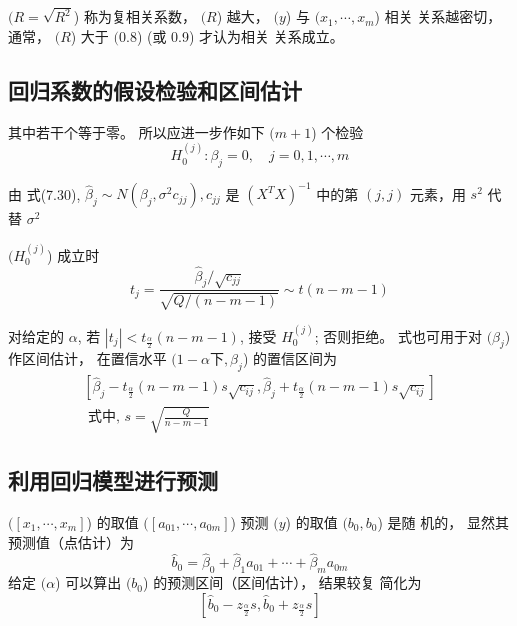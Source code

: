 $( {R}=\sqrt{{R}^{2}} $) 称为复相关系数， $( {R} $) 越大， $( {y} $) 与 $( {x}_{1}, \cdots, {x}_{m} $) 相关
关系越密切， 通常，  $( {R} $) 大于 $( 0.8 $) (或 0.9) 才认为相关
关系成立。 

\subsection{回归系数的假设检验和区间估计}

其中若干个等于零。 所以应进一步作如下 $( {m}+{1} $) 个检验
\begin{equation}H_{0}^{(j)}: \beta_{j}=0, \quad j=0,1, \cdots, m \end{equation}

由 式(7.30), $\hat{\beta}_{j} \sim N\left(\beta_{j}, \sigma^{2} c_{j j}\right), c_{j j}$  是 $\left(X^{T} X\right)^{-1}$  中的第 $ (j, j) $ 元素，用 $ s^{2} $ 代替 $ \sigma^{2} $


$( {H}_{0}^{(j)} $) 成立时
\begin{equation}
t_{j}=\frac{\hat{\beta}_{j} / \sqrt{c_{j j}}}{\sqrt{Q /(n-m-1)}} \sim t(n-m-1)
\end{equation}

对给定的 $ \alpha $, 若 $ \left|t_{j}\right|<t_{\frac{\alpha}{2}}(n-m-1) $, 接受 $ H_{0}^{(j)} $; 否则拒绝。  式也可用于对 $( \beta_{j} $) 作区间估计， 在置信水平 $( 1-\alpha 下, \beta_{j} $) 的置信区间为
\begin{equation}
\begin{array}{l}
{\left[\hat{\beta}_{j}-t_{\frac{\alpha}{2}}(n-m-1) s \sqrt{c_{i j}}, \hat{\beta}_{j}+t_{\frac{\alpha}{2}}(n-m-1) s \sqrt{c_{i j}}\right]} \\
\text { 式中, } s=\sqrt{\frac{Q}{n-m-1}} 
\end{array}
\end{equation}

\subsection{利用回归模型进行预测}

$( \left[x_{1}, \cdots, x_{m}\right] $) 的取值 $( \left[a_{01}, \cdots, a_{0 m}\right] $) 预测 $( y $) 的取值 $( b_{0}, b_{0} $) 是随 机的， 显然其预测值（点估计）为
\begin{equation}
\hat{b}_{0}=\hat{\beta}_{0}+\hat{\beta}_{1} a_{01}+\cdots+\hat{\beta}_{m} a_{0 m} 
\end{equation}
给定 $( \alpha $) 可以算出 $( {b}_{{0}} $) 的预测区间（区间估计）， 结果较复
简化为
\begin{equation}
\left[\hat{b}_{0}-z_{\frac{\alpha}{2}} s, \hat{b}_{0}+z_{\frac{\alpha}{2}} s\right]
\end{equation}

